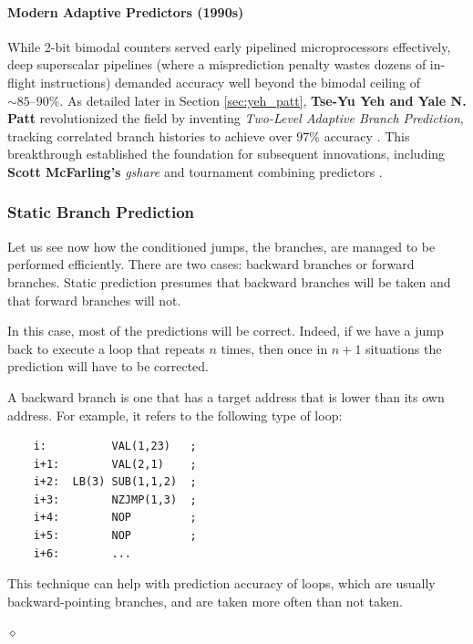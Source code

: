 \paragraph{Modern Adaptive Predictors (1990s)}
While 2-bit bimodal counters served early pipelined microprocessors effectively, deep superscalar pipelines (where a misprediction penalty wastes dozens of in-flight instructions) demanded accuracy well beyond the bimodal ceiling of $\sim 85\text{--}90\%$. As detailed later in Section \ref{sec:yeh_patt}, \textbf{Tse-Yu Yeh and Yale N. Patt} revolutionized the field by inventing \textit{Two-Level Adaptive Branch Prediction}, tracking correlated branch histories to achieve over $97\%$ accuracy \cite{yeh1991twolevel, yeh1992alternative}. This breakthrough established the foundation for subsequent innovations, including \textbf{Scott McFarling's} \textit{gshare} and tournament combining predictors \cite{mcfarling1993combining}.


\subsubsection{Static Branch Prediction}

Let us see now how the conditioned jumps, the branches, are managed to be performed efficiently. There are two cases: backward branches or forward branches. Static prediction presumes that backward branches will be taken and that forward branches will not.

In this case, most of the predictions will be correct. Indeed, if we have a jump back to execute a loop that repeats $n$ times, then once in $n+1$ situations the prediction will have to be corrected.

\begin{exemplu}
A backward branch is one that has a target address that is lower than its own address. For example,
it  refers to the following type of loop:
\begin{verbatim}
    i:          VAL(1,23)   ;
    i+1:        VAL(2,1)    ;
    i+2:  LB(3) SUB(1,1,2)  ;
    i+3:        NZJMP(1,3)  ;
    i+4:        NOP         ;
    i+5:        NOP         ;
    i+6:        ...
\end{verbatim}
This technique can help with prediction accuracy of loops, which are usually backward-pointing branches, and are taken more often than not taken.

$\diamond$
\end{exemplu}

